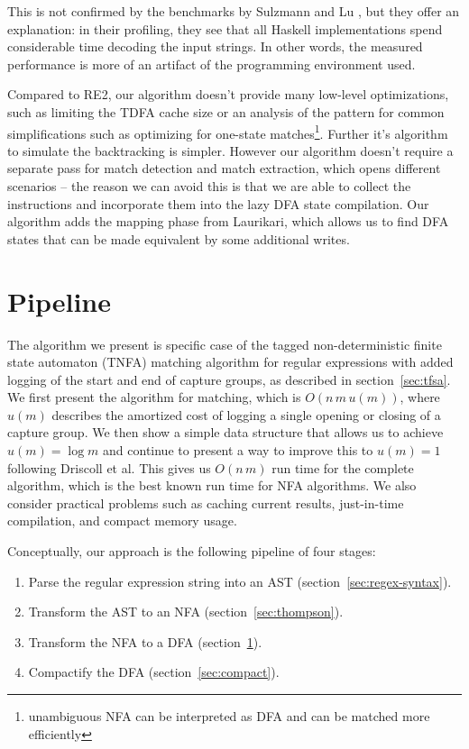 \documentclass[11pt,a4paper,twoside,openright]{Thesis}
\theoremstyle{definition}
\newcommand{\Secref}[1]{section~\ref{sec:#1}}
\begin{document}
This is not confirmed by the benchmarks by Sulzmann and Lu
\cite{Sulz12a}, but they offer an explanation: in their profiling, they see
that all Haskell implementations spend considerable time decoding the input
strings. In other words, the measured performance is more of an artifact of the
programming environment used.

Compared to \textsc{RE2}, our algorithm doesn't provide many low-level optimizations,
such as limiting the TDFA cache size or an analysis of the pattern for common
simplifications such as optimizing for one-state matches\footnote{unambiguous
NFA can be interpreted as DFA and can be matched more efficiently}. Further 
it's algorithm to simulate the backtracking is simpler. However our algorithm
doesn't require a separate pass for match detection and match extraction, which
opens different scenarios -- the reason we can avoid this is that we are able
to collect the instructions and incorporate them into the lazy DFA state
compilation. Our algorithm adds the mapping phase from Laurikari, which allows
us to find DFA states that can be made equivalent by some additional writes.

\section{Pipeline}\label{sec:tnfa}

The algorithm we present is specific case of the tagged non-deterministic
finite state automaton (TNFA) matching algorithm for regular expressions with
added logging of the start and end of capture groups, as described in
\Secref{tfsa}. We first present the algorithm for matching, which is $O(n\, m\,
u(m))$, where $u(m)$ describes the amortized cost of logging a single opening
or closing of a capture group. We then show a
simple data structure that allows us to achieve $u(m) = \log m$ and
continue to present a way to improve this to $u(m) = 1$ following Driscoll et
al\cite{Dris89a}. This gives us $O(n\, m)$ run time for the
complete algorithm, which is the best known run time for NFA algorithms. We 
also consider practical problems such as caching current results, just-in-time
compilation, and compact memory usage.

Conceptually, our approach is the following pipeline of four stages:
\begin{enumerate}
  \item Parse the regular expression string into an AST (\Secref{regex-syntax}).
  \item Transform the AST to an NFA (\Secref{thompson}).
  \item Transform the NFA to a DFA (\Secref{tnfa}).
  \item Compactify the DFA (\Secref{compact}).
\end{enumerate}
\end{document}
